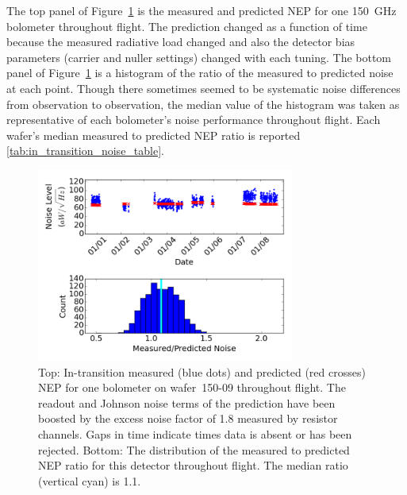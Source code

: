 


The top panel of Figure~\ref{fig:in_transition_noise_vs_time} is the measured and predicted \ac{NEP} for one 150~GHz bolometer throughout flight. 
The prediction changed as a function of time because the measured radiative load changed and also the detector bias parameters (carrier and nuller settings) changed with each tuning. 
The bottom panel of Figure~\ref{fig:in_transition_noise_vs_time} is a histogram of the ratio of the measured to predicted noise at each point. 
Though there sometimes seemed to be systematic noise differences from observation to observation, the median value of the histogram was taken as representative of each bolometer's noise performance throughout flight. 
Each wafer's median measured to predicted \ac{NEP} ratio is reported \TAB\ref{tab:in_transition_noise_table}. 

\begin{figure}[htp]
\begin{center}
\includegraphics[height=2.5in]{figures/board68_wire2_ch06_transition.png}
\caption[In-transition measured noise as function of time for one bolometer on wafer~150-09 ]{Top: In-transition measured (blue dots) and predicted (red crosses) \ac{NEP} for one bolometer on wafer~150-09 throughout flight. 
The readout and Johnson noise terms of the prediction have been boosted by the excess noise factor of 1.8 measured by resistor channels. 
Gaps in time indicate times data is absent or has been rejected. 
Bottom: The distribution 
of the measured to predicted \ac{NEP} ratio for this detector throughout flight. The median ratio (vertical cyan) is 1.1.
\label{fig:in_transition_noise_vs_time} }
\end{center}
\end{figure}

